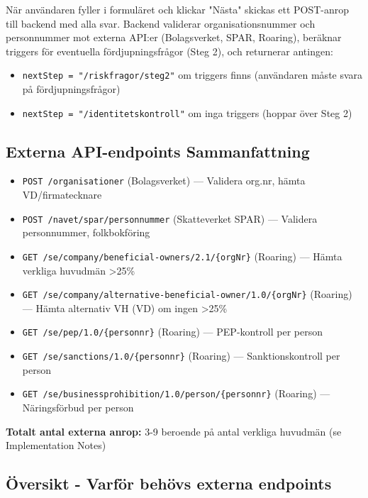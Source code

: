 När användaren fyller i formuläret och klickar "Nästa" skickas ett POST-anrop till backend med alla svar. Backend validerar organisationsnummer och personnummer mot externa API:er (Bolagsverket, SPAR, Roaring), beräknar triggers för eventuella fördjupningsfrågor (Steg 2), och returnerar antingen:
\begin{itemize}[noitemsep]
  \item \texttt{nextStep = "/riskfragor/steg2"} om triggers finns (användaren måste svara på fördjupningsfrågor)
  \item \texttt{nextStep = "/identitetskontroll"} om inga triggers (hoppar över Steg 2)
\end{itemize}

\subsection{Externa API-endpoints Sammanfattning}

\begin{itemize}[noitemsep]
  \item \texttt{POST /organisationer} (Bolagsverket) — Validera org.nr, hämta VD/firmatecknare
  \item \texttt{POST /navet/spar/personnummer} (Skatteverket SPAR) — Validera personnummer, folkbokföring
  \item \texttt{GET /se/company/beneficial-owners/2.1/\{orgNr\}} (Roaring) — Hämta verkliga huvudmän >25\%
  \item \texttt{GET /se/company/alternative-beneficial-owner/1.0/\{orgNr\}} (Roaring) — Hämta alternativ VH (VD) om ingen >25\%
  \item \texttt{GET /se/pep/1.0/\{personnr\}} (Roaring) — PEP-kontroll per person
  \item \texttt{GET /se/sanctions/1.0/\{personnr\}} (Roaring) — Sanktionskontroll per person
  \item \texttt{GET /se/businessprohibition/1.0/person/\{personnr\}} (Roaring) — Näringsförbud per person
\end{itemize}

\textbf{Totalt antal externa anrop:} 3-9 beroende på antal verkliga huvudmän (se Implementation Notes)

\subsection{Översikt - Varför behövs externa endpoints}

